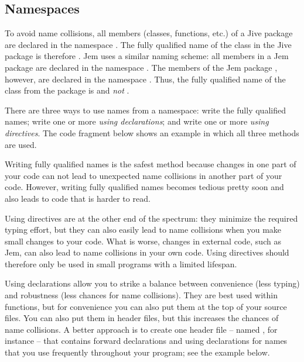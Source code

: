 \subsection*{Namespaces}

To avoid name collisions, all members (classes, functions, etc.) of a
Jive package are declared in the namespace
. The fully qualified name of the class
 in the Jive package  is therefore
. Jem uses a similar naming scheme: all
members in a Jem package are declared in the namespace
. The members of the Jem package
, however, are declared in the namespace . Thus, the
fully qualified name of the class  from the 
package is  and \emph{not}
.

There are three ways to use names from a namespace: write the fully
qualified names; write one or more \emph{using declarations}; and write
one or more \emph{using directives}. The code fragment below shows an
example in which all three methods are used.


Writing fully qualified names is the safest method because changes in one
part of your code can not lead to unexpected name collisions in another
part of your code. However, writing fully qualified names becomes tedious
pretty soon and also leads to code that is harder to read.

Using directives are at the other end of the spectrum: they minimize the
required typing effort, but they can also easily lead to name collisions
when you make small changes to your code. What is worse, changes in
external code, such as Jem, can also lead to name collisions in your own
code. Using directives should therefore only be used in small programs
with a limited lifespan.

Using declarations allow you to strike a balance between convenience
(less typing) and robustness (less chances for name collisions). They are
best used within functions, but for convenience you can also put them at
the top of your source files. You can also put them in header files, but
this increases the chances of name collisions. A better approach is to
create one header file -- named , for instance -- that
contains forward declarations and using declarations for names that you
use frequently throughout your program; see the example below.

